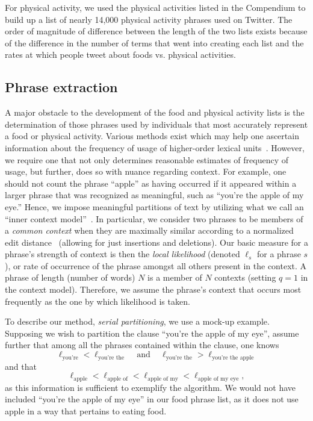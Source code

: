 \documentclass[10pt]{article}
\newcommand{\phrasesymbol}{s}
\begin{document}
For physical activity, we used the physical activities listed in the
Compendium to build up a list of nearly 14,000 physical activity
phrases used on Twitter.
The order of magnitude of difference between the length of the two
lists exists because of the difference in the number of terms that
went into creating each list and the rates at which people tweet about
foods vs. physical activities.

\subsection*{Phrase extraction}
\label{subsec:fluxwell.methods-phrase-extraction}

A major obstacle to the development of the food and physical activity
lists is the determination of those phrases used by individuals that
most accurately represent a food or physical activity.  Various
methods exist which may help one ascertain information about the
frequency of usage of higher-order lexical units~\cite{williams2014a}.
However, we require one that not only determines reasonable estimates
of frequency of usage, but further, does so with nuance regarding
context.  For example, one should not count the phrase ``apple'' as
having occurred if it appeared within a larger phrase that was
recognized as meaningful, such as ``you're the apple of my eye.''
Hence, we impose meaningful partitions of text by utilizing what
we call an ``inner context model''~\cite{williams2015c}.
In particular, we consider two phrases to be members
of a \textit{common context} when they are maximally similar according
to a normalized edit distance~\cite{levenshtein1966bcc} (allowing for
just insertions and deletions). Our basic measure for a phrase's
strength of context is then the \textit{local likelihood} (denoted
$\ell_{\phrasesymbol}$ for a phrase $\phrasesymbol$), or rate of occurrence of the phrase
amongst all others present in the context.  
A phrase of length (number of words) $N$ is a member of $N$ contexts (setting $q=1$ in the context model).
Therefore, we assume the
phrase's context that occurs most frequently as the one by which
likelihood is taken.

To describe our method, \textit{serial partitioning}, we use a mock-up
example.  Supposing we wish to partition the clause ``you're the apple
of my eye'', assume further that among all the phrases contained
within the clause, one knows
$$\ell_{\text{you're}} < \ell_{\text{you're the}} \hspace{10pt} \text{ and } \hspace{10pt} \ell_{\text{you're the}} > \ell_{\text{you're the apple}}$$ 
and that
$$\ell_{\text{apple}} < \ell_{\text{apple of}} < \ell_{\text{apple of my}} < \ell_{\text{apple of my eye}},$$ 
as this information is sufficient to exemplify the algorithm.  We
would not have included ``you're the apple of my eye'' in our food
phrase list, as it does not use apple in a way that pertains to eating
food.
\end{document}
